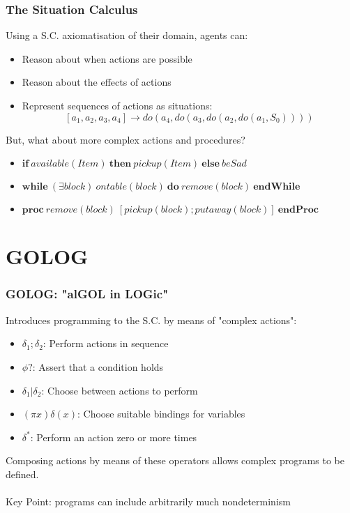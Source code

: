 \documentclass{beamer}
\begin{document}
\begin{frame}
\frametitle{The Situation Calculus}
Using a S.C. axiomatisation of their domain, agents can:
\begin{itemize}
  \item Reason about when actions are possible
  \item Reason about the effects of actions
  \item Represent sequences of actions as situations:\[
\left[a_1, a_2, a_3, a_4\right] \rightarrow do(a_4,do(a_3,do(a_2,do(a_1,S_0))))
\]
\end{itemize}
\pause
But, what about more complex actions and procedures?
\begin{itemize}
  \item $\mathbf{if}\ available(Item)\ \mathbf{then}\ pickup(Item)\ \mathbf{else}\ beSad$
  \item $\mathbf{while}\ (\exists block)\ ontable(block)\ \mathbf{do}\ remove(block)\ \mathbf{endWhile}$
  \item $\mathbf{proc}\ remove(block)\ [pickup(block);putaway(block)]\ \mathbf{endProc}$
\end{itemize}
\end{frame}

\section{GOLOG}
\begin{frame}
\frametitle{GOLOG: "alGOL in LOGic"}
Introduces programming to the S.C. by means of "complex actions":
\begin{itemize}
  \pause
  \item $\delta_1;\delta_2$: Perform actions in sequence
  \pause
  \item $\phi?$: Assert that a condition holds
  \pause
  \item $\delta_1|\delta_2$: Choose between actions to perform
  \pause
  \item $(\pi x)\delta(x)$: Choose suitable bindings for variables
  \pause
  \item $\delta^*$: Perform an action zero or more times
  \pause
\end{itemize}
Composing actions by means of these operators allows complex programs
to be defined.\\
\ \\
\pause
Key Point:  programs can include arbitrarily much \alert{nondeterminism}
\end{frame}
\end{document}
